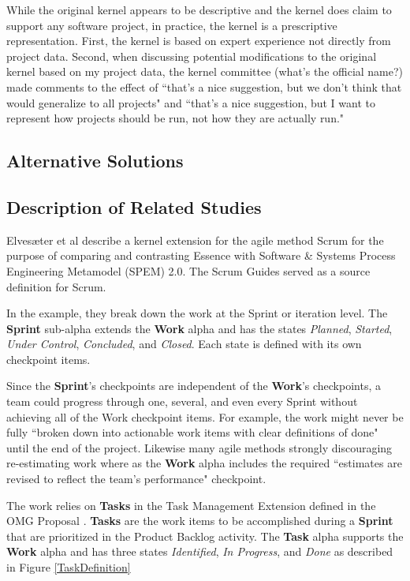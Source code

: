\documentclass[preprint,12pt,3p]{elsarticle}
\begin{document}
While the original kernel appears to be descriptive and the kernel does claim to support any software project, in practice, the kernel is a prescriptive representation. First, the kernel is based on expert experience not directly from project data. Second, when discussing potential modifications to the original kernel based on my project data, the kernel committee (what's the official name?) made comments to the effect of ``that's a nice suggestion, but we don't think that would generalize to all projects" and ``that's a nice suggestion, but I want to represent how projects should be run, not how they are actually run." 

\subsection{Alternative Solutions}

\subsection{Description of Related Studies}

Elves{\ae}ter et al \cite{Elvesaeter2013} describe a kernel extension for the agile method Scrum \cite{Schwaber2001} for the purpose of comparing and contrasting Essence with Software \& Systems Process Engineering Metamodel (SPEM) 2.0. The Scrum Guides \cite{ScrumGuide} served as a source definition for Scrum. 

In the example, they break down the work at the Sprint or iteration level. The \textbf{Sprint} sub-alpha extends the \textbf{Work} alpha and has the states \textit{Planned}, \textit{Started}, \textit{Under Control}, \textit{Concluded}, and \textit{Closed}. Each state is defined with its own checkpoint items. 

Since the \textbf{Sprint}'s checkpoints are independent of the \textbf{Work}'s checkpoints, a team could progress through one, several, and even every Sprint without achieving all of the Work checkpoint items. For example, the work might never be fully ``broken down into actionable work items with clear definitions of done" until the end of the project. Likewise many agile methods strongly discouraging re-estimating work \cite{} where as the \textbf{Work} alpha includes the required ``estimates are revised to reflect the team’s performance" checkpoint. 

The work relies on \textbf{Tasks} in the Task Management Extension defined in the OMG Proposal \cite{OMGStandard}. \textbf{Tasks} are the work items to be accomplished during a \textbf{Sprint} that are prioritized in the Product Backlog activity. The \textbf{Task} alpha supports the \textbf{Work} alpha and has three states \textit{Identified}, \textit{In Progress}, and \textit{Done} as described in Figure \ref{TaskDefinition}
\end{document}
